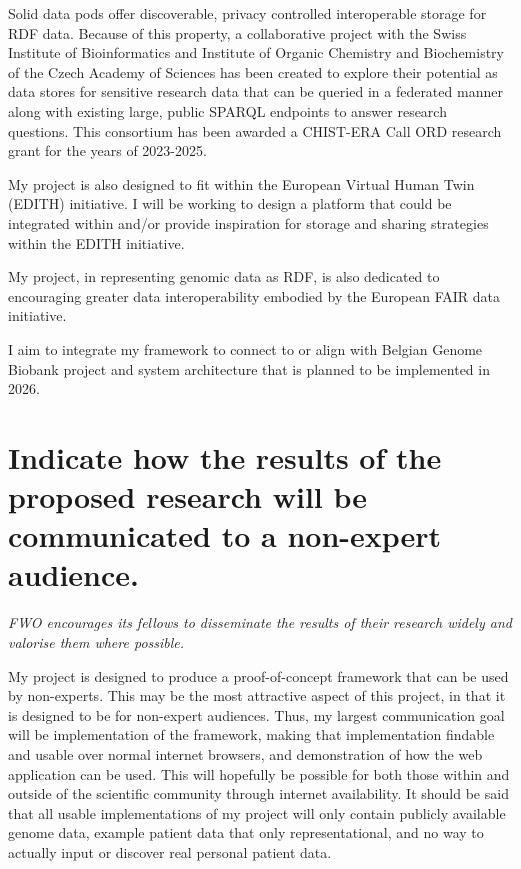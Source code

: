 {Solid data pods offer discoverable, privacy controlled interoperable storage for RDF data. 
Because of this property, a collaborative project with the Swiss Institute of Bioinformatics and Institute of Organic Chemistry and Biochemistry of the Czech Academy of Sciences has been created to explore their potential as data stores for sensitive research data that can be queried in a federated manner along with existing large, public SPARQL endpoints to answer research questions.
This consortium has been awarded a CHIST-ERA Call ORD research grant for the years of 2023-2025.

My project is also designed to fit within the European Virtual Human Twin (EDITH) initiative. 
I will be working to design a platform that could be integrated within and/or provide inspiration for storage and sharing strategies within the EDITH initiative.

My project, in representing genomic data as RDF, is also dedicated to encouraging greater data interoperability embodied by the European FAIR data initiative.

I aim to integrate my framework to connect to or align with Belgian Genome Biobank project and system architecture that is planned to be implemented in 2026.



\section{Indicate how the results of the proposed research will be communicated to a non-expert audience.}
\textit{
FWO encourages its fellows to disseminate the results of their research widely and valorise them where possible.
}

My project is designed to produce a proof-of-concept framework that can be used by non-experts. 
This may be the most attractive aspect of this project, in that it is designed to be for non-expert audiences.
Thus, my largest communication goal will be implementation of the framework, making that implementation findable and usable over normal internet browsers, and demonstration of how the web application can be used.
This will hopefully be possible for both those within and outside of the scientific community through internet availability. 
It should be said that all usable implementations of my project will only contain publicly available genome data, example patient data that only representational, and no way to actually input or discover real personal patient data.

}
